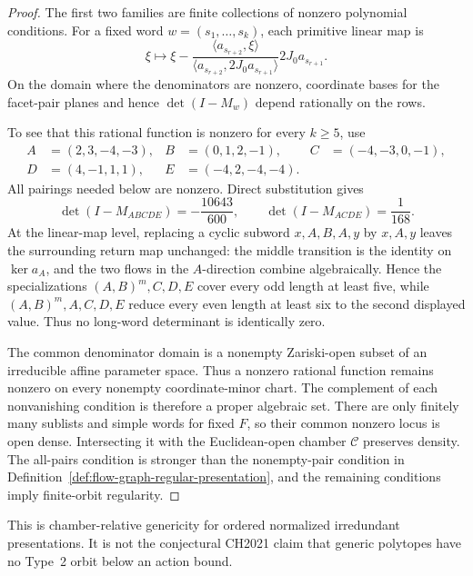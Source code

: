 \begin{proof}
The first two families are finite collections of nonzero polynomial
conditions.  For a fixed word \(w=(s_1,\ldots,s_k)\), each primitive linear
map is
\[
  \xi\longmapsto
  \xi-
  \frac{\langle a_{s_{r+2}},\xi\rangle}
       {\langle a_{s_{r+2}},2J_0a_{s_{r+1}}\rangle}
  2J_0a_{s_{r+1}}.
\]
On the domain where the denominators are nonzero, coordinate bases for the
facet-pair planes and hence \(\det(I-M_w)\) depend rationally on the rows.

To see that this rational function is nonzero for every \(k\geq5\), use
\[
\begin{aligned}
 A&=(2,3,-4,-3),& B&=(0,1,2,-1),& C&=(-4,-3,0,-1),\\
 D&=(4,-1,1,1),& E&=(-4,2,-4,-4).
\end{aligned}
\]
All pairings needed below are nonzero.  Direct substitution gives
\[
  \det(I-M_{ABCDE})=-\frac{10643}{600},
  \qquad
  \det(I-M_{ACDE})=\frac1{168}.
\]
At the linear-map level, replacing a cyclic subword
\(x,A,B,A,y\) by \(x,A,y\) leaves the surrounding return map unchanged: the
middle transition is the identity on \(\ker a_A\), and the two flows in the
\(A\)-direction combine algebraically.  Hence the specializations
\((A,B)^m,C,D,E\) cover every odd length at least five, while
\((A,B)^m,A,C,D,E\) reduce every even length at least six to the second
displayed value.  Thus no long-word determinant is identically zero.

The common denominator domain is a nonempty Zariski-open subset of an
irreducible affine parameter space.  Thus a nonzero rational function remains
nonzero on every nonempty coordinate-minor chart.  The complement of each
nonvanishing condition is therefore a proper algebraic set.  There are only
finitely many sublists and simple words for fixed \(F\), so their common
nonzero locus is open dense.  Intersecting it with the Euclidean-open chamber
\(\mathcal C\) preserves density.  The all-pairs condition is stronger than
the nonempty-pair condition in
Definition~\ref{def:flow-graph-regular-presentation}, and the remaining
conditions imply finite-orbit regularity.
\end{proof}

This is chamber-relative genericity for ordered normalized irredundant
presentations.  It is not the conjectural CH2021 claim that generic polytopes
have no Type~2 orbit below an action bound.



